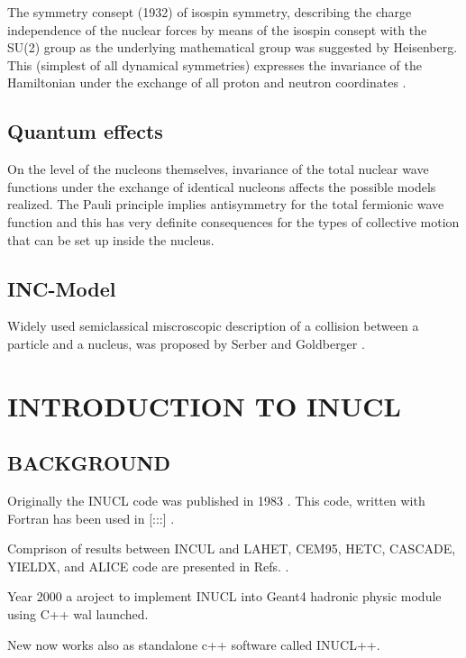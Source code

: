 The symmetry consept (1932) of isospin symmetry, 
describing the charge independence of the nuclear forces by means of the isospin consept with the SU(2) group as the underlying mathematical group was suggested by Heisenberg. 
This (simplest of all dynamical symmetries) expresses the invariance of the Hamiltonian under the exchange of all proton and neutron coordinates \cite{heyde98}.

\subsection{Quantum effects}

On the level of the nucleons themselves, invariance of the total nuclear wave functions under the exchange of identical nucleons affects the possible models realized. 
The Pauli principle implies antisymmetry for the total fermionic wave function and this has very definite consequences for the types of collective motion that can be set up inside the nucleus.


\subsection{INC-Model}

Widely used semiclassical miscroscopic description of a collision between a particle and a nucleus, 
was proposed by Serber \cite{serber47} and Goldberger \cite{goldberger48}.

\section{INTRODUCTION TO INUCL}

\subsection{BACKGROUND}
Originally the INUCL code was published in 1983 \cite{stepanov}.
This code, written with Fortran has been used in [:::] \cite{:::}.

Comprison of results between INCUL and LAHET, CEM95, HETC, CASCADE,
YIELDX, and ALICE code are presented in Refs. \cite{titarenko99a}.

Year 2000 a aroject to implement INUCL into Geant4 hadronic physic
module using C++ wal launched. 

New now  works also as standalone c++ software called INUCL++.


